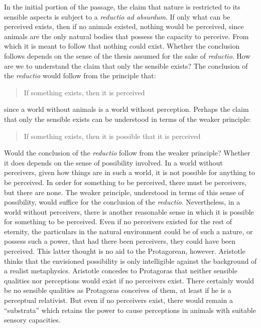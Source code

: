 In the initial portion of the passage, the claim that nature is restricted to its sensible aspects is subject to a \emph{reductio ad absurdum}. If only what can be perceived exists, then if no animals existed, nothing would be perceived, since animals are the only natural bodies that possess the capacity to perceive. From which it is meant to follow that nothing could exist. Whether the conclusion follows depends on the sense of the thesis assumed for the sake of \emph{reductio}. How are we to understand the claim that only the sensible exists? The conclusion of the \emph{reductio} would follow from the principle that:
\begin{quote}
	If something exists, then it is perceived
\end{quote}
since a world without animals is a world without perception. Perhaps the claim that only the sensible exists can be understood in terms of the weaker principle:
\begin{quote}
	If something exists, then it is possible that it is perceived 
\end{quote}
Would the conclusion of the \emph{reductio} follow from the weaker principle? Whether it does depends on the sense of possibility involved. In a world without perceivers, given how things are in such a world, it is not possible for anything to be perceived. In order for something to be perceived, there must be perceivers, but there are none. The weaker principle, understood in terms of this sense of possibility, would suffice for the conclusion of the \emph{reductio}. Nevertheless, in a world without perceivers, there is another reasonable sense in which it is possible for something to be perceived. Even if no perceivers existed for the rest of eternity, the particulars in the natural environment could be of such a nature, or possess such a power, that had there been perceivers, they could have been perceived. This latter thought is no aid to the Protagorean, however. Aristotle thinks that the envisioned possibility is only intelligible against the background of a realist metaphysics. Aristotle concedes to Protagoras that neither sensible qualities nor perceptions would exist if no perceivers exist. There certainly would be no sensible qualities as Protagoras conceives of them, at least if he is a perceptual relativist. But even if no perceivers exist, there would remain a ``substrata'' which retains the power to cause perceptions in animals with suitable sensory capacities. 

